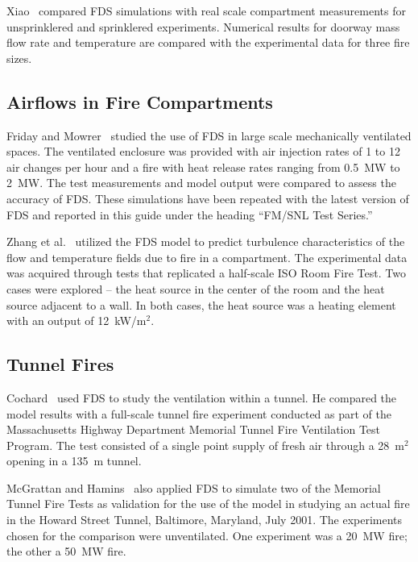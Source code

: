 Xiao~\cite{Xiao:FT2012} compared FDS simulations with real scale compartment measurements for unsprinklered and sprinklered experiments. Numerical results for doorway mass flow rate and temperature are compared with the experimental data for three fire sizes.



\subsection{Airflows in Fire Compartments}

Friday and Mowrer~\cite{Friday:1} studied the use of FDS in large scale mechanically ventilated spaces.  The ventilated enclosure was provided with air injection rates of 1 to 12 air changes per hour and a fire with heat release rates ranging from 0.5~MW to 2~MW. The test measurements and model output were compared to assess the accuracy of FDS. These simulations have been repeated with the latest version of FDS and reported in this guide under the heading ``FM/SNL Test Series.''

Zhang et al.~\cite{Zhang:2} utilized the FDS model to predict turbulence characteristics of the flow and temperature fields due to fire in a compartment.  The experimental data was acquired through tests that replicated a half-scale ISO Room Fire Test. Two cases were explored -- the heat source in the center of the room and the heat source adjacent to a wall. In both cases, the heat source was a heating element with an output of 12~kW/m$^2$.


\subsection{Tunnel Fires}

Cochard~\cite{Cochard:1} used FDS to study the ventilation within a tunnel. He compared the model results with a full-scale tunnel fire experiment conducted as part of the Massachusetts Highway Department Memorial Tunnel Fire Ventilation Test Program. The test consisted of a single point supply of fresh air through a 28~m$^2$ opening in a 135~m tunnel.

McGrattan and Hamins~\cite{McGrattan:HST} also applied FDS to simulate two of the Memorial Tunnel Fire Tests as validation for the use of the model in studying an actual fire in the Howard Street Tunnel, Baltimore, Maryland, July 2001. The experiments chosen for the comparison were unventilated. One experiment was a 20~MW fire; the other a 50~MW fire.

